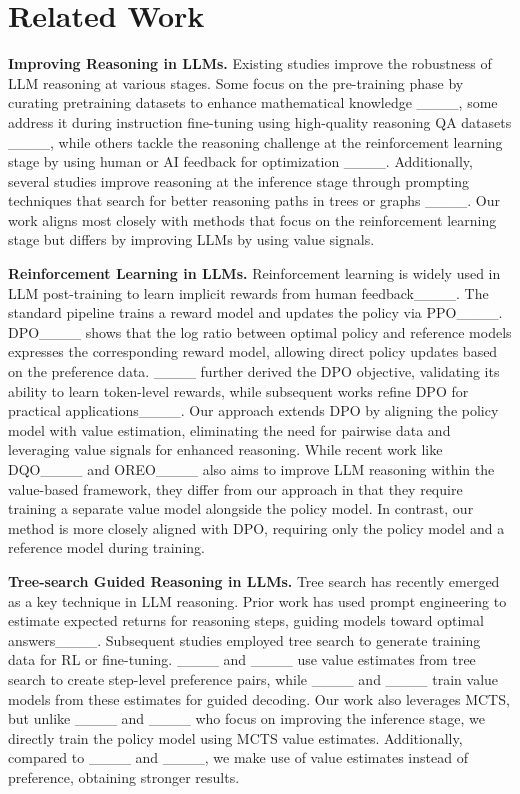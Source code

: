 \section{Related Work}
\textbf{Improving Reasoning in LLMs.} Existing studies improve the robustness of LLM reasoning at various stages. Some focus on the pre-training phase by curating pretraining datasets to enhance mathematical knowledge ____, some address it during instruction fine-tuning using high-quality reasoning QA datasets ____, while others tackle the reasoning challenge at the reinforcement learning stage by using human or AI feedback for optimization ____. Additionally, several studies improve reasoning at the inference stage through prompting techniques that search for better reasoning paths in trees or graphs ____. Our work aligns most closely with methods that focus on the reinforcement learning stage but differs by improving LLMs by using value signals. 

\textbf{Reinforcement Learning in LLMs.} Reinforcement learning is widely used in LLM post-training to learn implicit rewards from human feedback____. The standard pipeline trains a reward model and updates the policy via PPO____. DPO____ shows that the log ratio between optimal policy and reference models expresses the corresponding reward model, allowing direct policy updates based on the preference data. ____ further derived the DPO objective, validating its ability to learn token-level rewards, while subsequent works refine DPO for practical applications____. Our approach extends DPO by aligning the policy model with value estimation, eliminating the need for pairwise data and leveraging value signals for enhanced reasoning. While recent work like DQO____ and OREO____ also aims to improve LLM reasoning within the value-based framework, they differ from our approach in that they require training a separate value model alongside the policy model. In contrast, our method is more closely aligned with DPO, requiring only the policy model and a reference model during training.

\textbf{Tree-search Guided Reasoning in LLMs.} Tree search has recently emerged as a key technique in LLM reasoning. Prior work has used prompt engineering to estimate expected returns for reasoning steps, guiding models toward optimal answers____. Subsequent studies employed tree search to generate training data for RL or fine-tuning. ____ and ____ use value estimates from tree search to create step-level preference pairs, while ____ and ____ train value models from these estimates for guided decoding. Our work also leverages MCTS, but unlike ____ and ____ who focus on improving the inference stage, we directly train the policy model using MCTS value estimates. Additionally, compared to ____ and ____, we make use of value estimates instead of preference, obtaining stronger results.